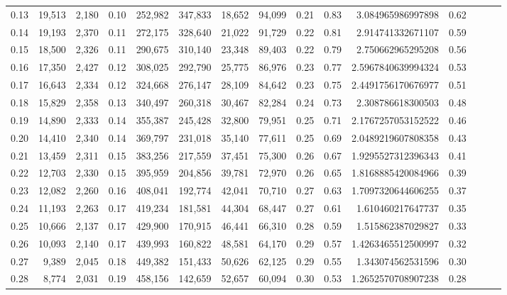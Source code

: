 \begin{tabular}{rrrrrrrrrrrrrrr}
0.13 &  19,513 &  2,180 &  0.10 &  252,982 &  347,833 &   18,652 &   94,099 &  0.21 &  0.83 &     3.084965986997898 &      0.62 \\
0.14 &  19,193 &  2,370 &  0.11 &  272,175 &  328,640 &   21,022 &   91,729 &  0.22 &  0.81 &     2.914741332671107 &      0.59 \\
0.15 &  18,500 &  2,326 &  0.11 &  290,675 &  310,140 &   23,348 &   89,403 &  0.22 &  0.79 &     2.750662965295208 &      0.56 \\
0.16 &  17,350 &  2,427 &  0.12 &  308,025 &  292,790 &   25,775 &   86,976 &  0.23 &  0.77 &    2.5967840639994324 &      0.53 \\
0.17 &  16,643 &  2,334 &  0.12 &  324,668 &  276,147 &   28,109 &   84,642 &  0.23 &  0.75 &    2.4491756170676977 &      0.51 \\
0.18 &  15,829 &  2,358 &  0.13 &  340,497 &  260,318 &   30,467 &   82,284 &  0.24 &  0.73 &     2.308786618300503 &      0.48 \\
0.19 &  14,890 &  2,333 &  0.14 &  355,387 &  245,428 &   32,800 &   79,951 &  0.25 &  0.71 &    2.1767257053152522 &      0.46 \\
0.20 &  14,410 &  2,340 &  0.14 &  369,797 &  231,018 &   35,140 &   77,611 &  0.25 &  0.69 &    2.0489219607808358 &      0.43 \\
0.21 &  13,459 &  2,311 &  0.15 &  383,256 &  217,559 &   37,451 &   75,300 &  0.26 &  0.67 &    1.9295527312396343 &      0.41 \\
0.22 &  12,703 &  2,330 &  0.15 &  395,959 &  204,856 &   39,781 &   72,970 &  0.26 &  0.65 &    1.8168885420084966 &      0.39 \\
0.23 &  12,082 &  2,260 &  0.16 &  408,041 &  192,774 &   42,041 &   70,710 &  0.27 &  0.63 &    1.7097320644606255 &      0.37 \\
0.24 &  11,193 &  2,263 &  0.17 &  419,234 &  181,581 &   44,304 &   68,447 &  0.27 &  0.61 &     1.610460217647737 &      0.35 \\
0.25 &  10,666 &  2,137 &  0.17 &  429,900 &  170,915 &   46,441 &   66,310 &  0.28 &  0.59 &     1.515862387029827 &      0.33 \\
0.26 &  10,093 &  2,140 &  0.17 &  439,993 &  160,822 &   48,581 &   64,170 &  0.29 &  0.57 &    1.4263465512500997 &      0.32 \\
0.27 &   9,389 &  2,045 &  0.18 &  449,382 &  151,433 &   50,626 &   62,125 &  0.29 &  0.55 &     1.343074562531596 &      0.30 \\
0.28 &   8,774 &  2,031 &  0.19 &  458,156 &  142,659 &   52,657 &   60,094 &  0.30 &  0.53 &    1.2652570708907238 &      0.28 \\

\end{tabular}
